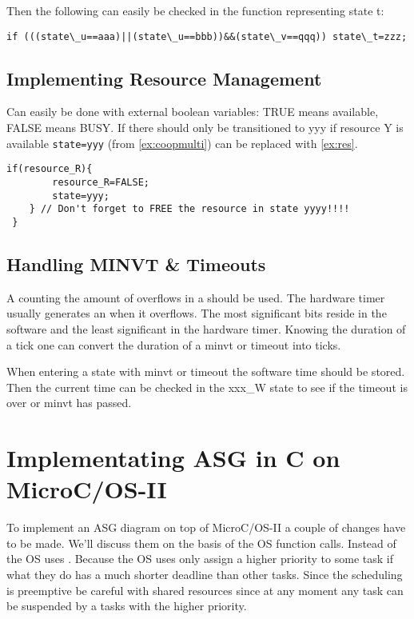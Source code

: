 \documentclass[../main.tex]{subfiles}
\begin{document}
Then the following can easily be checked in the function representing state t:
\begin{center}
\lstinline{if (((state\_u==aaa)||(state\_u==bbb))&&(state\_v==qqq)) state\_t=zzz;}
\end{center}

\subsection{Implementing Resource Management}
Can easily be done with external boolean variables: TRUE means available, FALSE means BUSY.
If there should only be transitioned to yyy if resource Y is available \lstinline{state=yyy} (from \ref{ex:coopmulti}) can be replaced with \ref{ex:res}.

\begin{lstlisting}[caption=Example of implementing resource management., label=ex:res]
	if(resource_R){
		resource_R=FALSE;
		state=yyy;
	} // Don't forget to FREE the resource in state yyyy!!!!
 }
\end{lstlisting}
\subsection{Handling MINVT \& Timeouts}
A  counting the amount of overflows in a  should be used.
The hardware timer usually generates an  when it overflows. 
The most significant bits reside in the software and the least significant in the hardware timer.
Knowing the duration of a tick one can convert the duration of a minvt or timeout into ticks.

When entering a state with minvt or timeout the software time should be stored.
Then the current time can be checked in the xxx\_W state to see if the timeout is over or minvt has passed.


\section{Implementating ASG in C on MicroC/OS-II}

To implement an ASG diagram on top of MicroC/OS-II a couple of changes have to be made.
We'll discuss them on the basis of the OS function calls.
Instead of  the OS uses . 
Because the OS uses  only assign a higher priority to some task if what they do has a much shorter deadline than other tasks.
Since the scheduling is preemptive be careful with shared resources since at any moment any task can be suspended by a tasks with the higher priority. 
\end{document}
